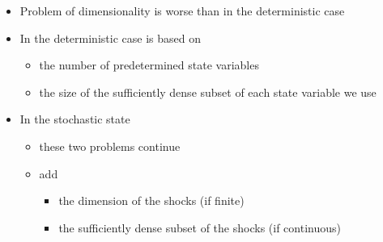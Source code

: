 \documentclass[notes=show]{beamer}
\begin{document}
\begin{frame}%


\begin{itemize}
\item Problem of dimensionality is worse than in the deterministic case

\item In the deterministic case is based on

\begin{itemize}
\item the number of predetermined state variables

\item the size of the sufficiently dense subset of each state variable we use
\end{itemize}

\item In the stochastic state

\begin{itemize}
\item these two problems continue

\item add

\begin{itemize}
\item the dimension of the shocks (if finite)

\item the sufficiently dense subset of the shocks (if continuous)
\end{itemize}
\end{itemize}
\end{itemize}

\end{frame}%
\end{document}
